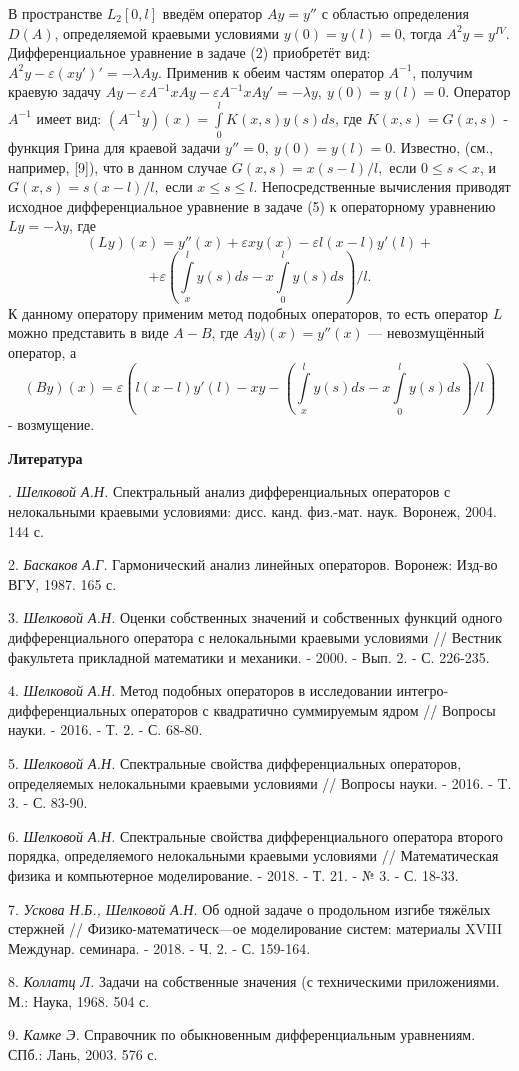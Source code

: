 В пространстве $L_{2}[0,l]$ введём оператор $Ay=y''$ с областью определения $D(A)$, определяемой краевыми условиями $y(0)=y(l)=0$, тогда $A^{2}y=y^{IV}$. Дифференциальное уравнение в задаче (2) приобретёт вид: $A^{2}y-\varepsilon(xy')'=-{\lambda}Ay$. Применив к обеим частям оператор $A^{-1}$, получим краевую задачу $Ay-{\varepsilon}A^{-1}xAy-{\varepsilon}A^{-1}xAy'=-{\lambda}y, ~ y(0)=y(l)=0$.
Оператор $A^{-1}$ имеет вид: $(A^{-1}y)(x)=\int\limits_0^l{K(x,s)y(s)}ds$, где $K(x,s)=G(x,s)$ - функция Грина для краевой задачи $y''=0,~y(0)=y(l)=0$.
Известно, (см., например, [9]), что в данном случае $G(x,s)=x(s-l)/l$,~если $0\le{s}<x$, и $G(x,s)=s(x-l)/l$,~если $x\le{s}\le{l}$.
Непосредственные вычисления приводят исходное дифференциальное уравнение в задаче (5) к операторному уравнению $Ly=-{\lambda}y$, где
$$(Ly)(x)=y''(x)+{\varepsilon}xy(x)-{\varepsilon}l(x-l)y'(l)+$$
$$+\varepsilon\left(\int\limits_x^l{y(s)}ds-x\int\limits_0^l{y(s)}ds\right)/l.$$
К данному оператору применим метод подобных операторов, то есть оператор $L$ можно представить в виде $A-B$, где $Ay)(x)=y''(x)$ --- невозмущённый оператор, а
$$(By)(x)={\varepsilon}\left(l(x-l)y'(l)-xy-\left(\int\limits_x^l{y(s)}ds-x\int\limits_0^l{y(s)}ds\right)/l\right)$$
- возмущение.



\smallskip \centerline {\bf Литература} . {\it Шелковой А.Н.} Спектральный анализ дифференциальных операторов с нелокальными краевыми условиями: дисс. канд. физ.-мат. наук. Воронеж, 2004.  144 с.

2. {\it Баскаков А.Г.} Гармонический анализ линейных операторов. Воронеж: Изд-во ВГУ, 1987. 165 с.

3. {\it Шелковой А.Н.} Оценки собственных значений и собственных функций одного дифференциального оператора с нелокальными краевыми условиями // Вестник факультета прикладной математики и механики. - 2000. - Вып. 2. - С. 226-235.

4. {\it Шелковой А.Н.} Метод подобных операторов в исследовании интегро-дифференциальных операторов с квадратично суммируемым ядром // Вопросы науки. - 2016. - Т. 2. - С. 68-80.

5. {\it Шелковой А.Н.} Спектральные свойства дифференциальных операторов, определяемых нелокальными краевыми условиями // Вопросы науки. - 2016. - T. 3. - С. 83-90.

6. {\it Шелковой А.Н.} Спектральные свойства дифференциального оператора второго порядка, определяемого нелокальными краевыми условиями // Математическая физика и компьютерное моделирование. - 2018. - Т. 21. - № 3. - С. 18-33.

7. {\it Ускова Н.Б., Шелковой А.Н.} Об одной задаче о продольном изгибе тяжёлых стержней // Физико-математическ---ое моделирование систем: материалы XVIII Междунар. семинара. - 2018. - Ч. 2. - С. 159-164.

8. {\it Коллатц Л.} Задачи на собственные значения (с техническими приложениями. М.: Наука, 1968. 504 с.

9. {\it Камке Э.} Справочник по обыкновенным дифференциальным уравнениям. СПб.: Лань, 2003. 576 с.

